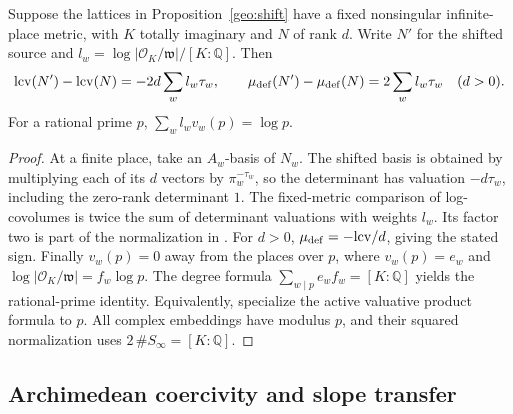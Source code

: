 \begin{corollary}\label{geo:shift-index}
Suppose the lattices in Proposition~\ref{geo:shift} have a fixed nonsingular infinite-place metric, with \(K\) totally imaginary and \(N\) of rank \(d\). Write \(N'\) for the shifted source and \(l_w=\log|\mathcal O_K/\mathfrak w|/[K:\mathbb Q]\). Then
\[
 \mathrm{lcv}(N')-\mathrm{lcv}(N)=-2d\sum_w l_w\tau_w,\qquad
 \mu_{\rm def}(N')-\mu_{\rm def}(N)=2\sum_w l_w\tau_w\quad(d>0).
\]
For a rational prime \(p\), \(\sum_w l_w v_w(p)=\log p\).
\end{corollary}
\begin{proof}
At a finite place, take an \(A_w\)-basis of \(N_w\). The shifted basis is obtained by multiplying each of its \(d\) vectors by \(\pi_w^{-\tau_w}\), so the determinant has valuation \(-d\tau_w\), including the zero-rank determinant \(1\). The fixed-metric comparison of log-covolumes is twice the sum of determinant valuations with weights \(l_w\). Its factor two is part of the normalization in . For \(d>0\), \(\mu_{\rm def}=-\mathrm{lcv}/d\), giving the stated sign. Finally \(v_w(p)=0\) away from the places over \(p\), where \(v_w(p)=e_w\) and \(\log|\mathcal O_K/\mathfrak w|=f_w\log p\). The degree formula \(\sum_{w\mid p}e_w f_w=[K:\mathbb Q]\) yields the rational-prime identity. Equivalently, specialize the active valuative product formula to \(p\). All complex embeddings have modulus \(p\), and their squared normalization uses \(2\,\#S_\infty=[K:\mathbb Q]\). 
\end{proof}


\subsection{Archimedean coercivity and slope transfer}

